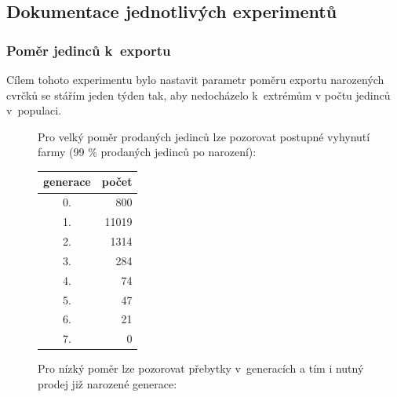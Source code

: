 \documentclass[11pt, a4paper, titlepage]{article}
\begin{document}
    \subsection{Dokumentace jednotlivých experimentů}

    \subsubsection{Poměr jedinců k~exportu}
    Cílem tohoto experimentu bylo nastavit parametr poměru exportu narozených cvrčků se stářím jeden týden tak, aby
    nedocházelo k~extrémům v počtu jedinců v~populaci.
    \begin{figure}[H]
        \centering
        \begin{minipage}{.48\textwidth}
            Pro velký poměr prodaných jedinců lze pozorovat postupné vyhynutí farmy (99 \% prodaných jedinců po narození):
            \hspace{10pt}
            \begin{center}
                \begin{table}[H]
                    \begin{tabular}{|c|r|}
                        \hline
                        generace & počet \\
                        \hline
                        0. & 800  \\
                        1. & 11019  \\
                        2. & 1314  \\
                        3. & 284  \\
                        4. & 74  \\
                        5. & 47  \\
                        6. & 21  \\
                        7. & 0  \\
                        \hline
                    \end{tabular}
                \end{table}
            \end{center}
        \end{minipage}%
        \hspace{.04\textwidth}%
        \begin{minipage}{.48\textwidth}
            Pro nízký poměr lze pozorovat přebytky v~generacích a tím i nutný prodej již narozené generace:
            \begin{center}
                \begin{table}[H]

\end{table}
\end{center}
\end{minipage}
\end{figure}
\end{document}
